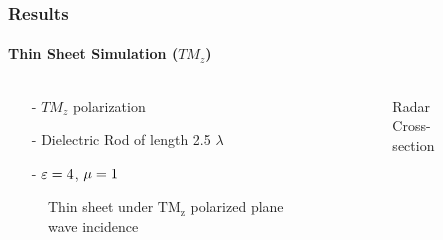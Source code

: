 \documentclass[mathserif,18pt,xcolor=table]{beamer}
\begin{document}
      \begin{frame}
        \frametitle{Results}
        \framesubtitle{Thin Sheet Simulation ($TM_z$)}
        \begin{columns}[T] %
          \begin{column}{.5\textwidth}
            \begin{itemize}
              \item[-]{$TM_z$ polarization}
              \item[-]{Dielectric Rod of length 2.5 $\lambda$}
              \item[-]{$\varepsilon = 4$, $\mu = 1$}
            \end{itemize}
            \begin{figure}[h]
              \normalsize
              \centering
              
              \caption{Thin sheet under $\mathrm{TM_z}$ polarized plane wave incidence}
              \label{fig:tm_plate}
            \end{figure}
          \end{column}
          \begin{column}[T]{.5\textwidth}
            \begin{figure}
              \vspace*{-2cm}
              
              \caption{Radar Cross-section}
              \label{fig:TM_rcs}
            \end{figure}
            \end{column}%
          \end{columns}
        \end{frame}
\end{document}

